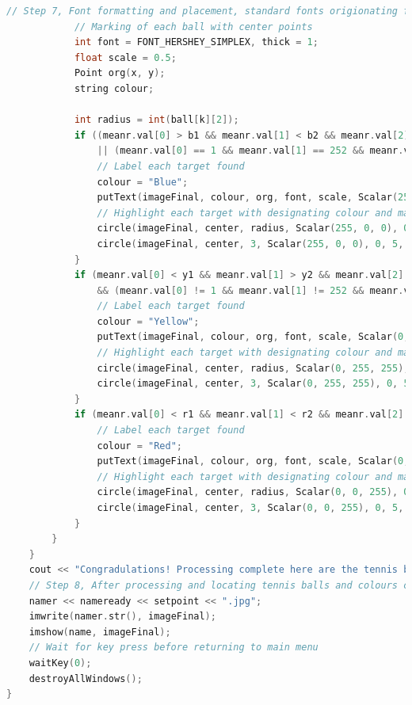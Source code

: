 \documentclass[a4paper, 10pt]{article}
\begin{document}
\begin{lstlisting}[language = C++]
			// Step 7, Font formatting and placement, standard fonts origionating from center point of each ball
			// Marking of each ball with center points
			int font = FONT_HERSHEY_SIMPLEX, thick = 1;
			float scale = 0.5;
			Point org(x, y);
			string colour;

			int radius = int(ball[k][2]);
			if ((meanr.val[0] > b1 && meanr.val[1] < b2 && meanr.val[2] < b3)
				|| (meanr.val[0] == 1 && meanr.val[1] == 252 && meanr.val[2] == 251)) {
				// Label each target found
				colour = "Blue";
				putText(imageFinal, colour, org, font, scale, Scalar(255, 0, 0), thick, 5);
				// Highlight each target with designating colour and mark the center points
				circle(imageFinal, center, radius, Scalar(255, 0, 0), 0, 5, 0);
				circle(imageFinal, center, 3, Scalar(255, 0, 0), 0, 5, 0);
			}
			if (meanr.val[0] < y1 && meanr.val[1] > y2 && meanr.val[2] > y3
				&& (meanr.val[0] != 1 && meanr.val[1] != 252 && meanr.val[2] != 251)) {
				// Label each target found
				colour = "Yellow";
				putText(imageFinal, colour, org, font, scale, Scalar(0, 255, 255), thick, 5);
				// Highlight each target with designating colour and mark the center points
				circle(imageFinal, center, radius, Scalar(0, 255, 255), 0, 5, 0);
				circle(imageFinal, center, 3, Scalar(0, 255, 255), 0, 5, 0);
			}			
			if (meanr.val[0] < r1 && meanr.val[1] < r2 && meanr.val[2] > r3) {
				// Label each target found
				colour = "Red";
				putText(imageFinal, colour, org, font, scale, Scalar(0, 0, 255), thick, 5);
				// Highlight each target with designating colour and mark the center points
				circle(imageFinal, center, radius, Scalar(0, 0, 255), 0, 5, 0);
				circle(imageFinal, center, 3, Scalar(0, 0, 255), 0, 5, 0);
			}
		}
	}
	cout << "Congradulations! Processing complete here are the tennis balls found with their respected colours!\n\npress any key to go back to main menu, or hit esc twice to quit\n\n-------------------------------------------------------------------------\n" << endl;
	// Step 8, After processing and locating tennis balls and colours complete, display final results, and save for reference
	namer << nameready << setpoint << ".jpg";
	imwrite(namer.str(), imageFinal);
	imshow(name, imageFinal); 
	// Wait for key press before returning to main menu
	waitKey(0);
	destroyAllWindows();
}
\end{lstlisting}
\end{document}
